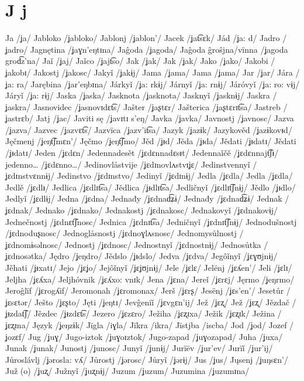 \chapter{J j}
Ja /ʝa/
Jabloko /ʝabloko/
Jablonj /ʝablon’/
Jacek /ʝat͡sɛk/
Jád /ʝa: d/
Jadro /ʝadro/
Jagnętina /ʝaɣn’eŋtɪna/
Jaĝoda /ʝagoda/
Jaĝoda ĝroŝjna/vïnna /ʝagoda grod͡z’na/
Jaǐ /ʝaj/
Jaǐco /ʝajt͡so/
Jak /ʝak/
Jak /ʝak/
Jako /ʝako/
Jakobi /ʝakobɪ/
Jakostj /ʝakosc/
Jakyǐ /ʝakɨj/
Jama /ʝama/
Jama /ʝama/
Jar /ʝar/
Jára /ʝa: ra/
Jarębina /ʝar’eŋbɪna/
Járkyǐ /ʝa: rkɨj/
Járnyǐ /ʝa: rnɨj/
Járóvyǐ /ʝa: ro: vɨj/
Járyǐ /ʝa: rɨj/
Jaska /ʝaska/
Jasknota /ʝasknota/
Jasknyǐ /ʝasknɨj/
Jaskra /ʝaskra/
Jasnovidec /ʝasnovɪdɛt͡s/
Jašter /ʝaʂtɛr/
Jašterica /ʝaʂtɛrɪt͡sa/
Jastreb /ʝastrɛb/
Jatj /ʝac/
Javiti sę /ʝavɪtɪ s’eŋ/
Javka /ʝavka/
Javnostj /ʝavnosc/
Jazva /ʝazva/
Jazvec /ʝazvɛt͡s/
Jazvïca /ʝazv’it͡sa/
Jazyk /ʝazɨk/
Jazykověd /ʝazɨkovᵻd/
Jęčmenj /ʝeŋt͡ʃmɛn’/
Jęčmo /ʝeŋt͡ʃmo/
Jěd /ʝᵻd/
Jěda /ʝᵻda/
Jědati /ʝᵻdatɪ/
Jědati /ʝᵻdatɪ/
Jeden /ʝɛdɛn/
Jedennadesět /ʝɛdɛnnadɛsᵻt/
Jedennaǐčě /ʝɛdɛnnajt͡ʃᵻ/
jedenno… /ʝɛdɛnno…/
Jedinovlåstvije /ʝɛdɪnovlʌstvɪʝɛ/
Jedinstvennyǐ /ʝɛdɪnstvɛnnɨj/
Jedinstvo /ʝɛdɪnstvo/
Jedinyǐ /ʝɛdɪnɨj/
Jedla /ʝɛdla/
Jedla /ʝɛdla/
Jedlě /ʝɛdlᵻ/
Jedlica /ʝɛdlɪt͡sa/
Jědlica /ʝᵻdlɪt͡sa/
Jedličnyǐ /ʝɛdlɪt͡ʃnɨj/
Jědlo /ʝᵻdlo/
Jedlyǐ /ʝɛdlɨj/
Jedna /ʝɛdna/
Jednađy /ʝɛdnad͡ʑɨ/
Jednađy /ʝɛdnad͡ʑɨ/
Jednak /ʝɛdnak/
Jednako /ʝɛdnako/
Jednakostj /ʝɛdnakosc/
Jednakovyǐ /ʝɛdnakovɨj/
Jednečnostj /ʝɛdnɛt͡ʃnosc/
Jednica /ʝɛdnɪt͡sa/
Jedničnyǐ /ʝɛdnɪt͡ʃnɨj/
Jednodušnostj /ʝɛdnoduʂnosc/
Jednoglåsnostj /ʝɛdnoɣlʌsnosc/
Jednomysůlnostj /ʝɛdnomɨsəlnosc/
Jednostj /ʝɛdnosc/
Jednostnyǐ /ʝɛdnostnɨj/
Jednosůtka /ʝɛdnosətka/
Jędro /ʝeŋdro/
Jědslo /ʝᵻdslo/
Jedva /ʝɛdva/
Jegôǐnyǐ /ʝɛɣʊjnɨj/
Jěhati /ʝᵻxatɪ/
Jejo /ʝɛʝo/
Jejôǐnyǐ /ʝɛʝʊjnɨj/
Jele /ʝɛlɛ/
Jelënj /ʝɛʎen’/
Jeli /ʝɛlɪ/
Jeljha /ʝɛʎxa/
Jeljhóvnik /ʝɛʎxo: vnɪk/
Jena /ʝɛna/
Jereǐ /ʝɛrɛj/
Jęrmo /ʝeŋrmo/
Jeroĝlïf /ʝɛrogʎif/
Jeromonah /ʝɛromonax/
Jerš /ʝɛrʂ/
Jesënj /ʝɛs’en’/
Jesetůr /ʝɛsɛtər/
Ješto /ʝɛʂto/
Jęti /ʝeŋtɪ/
Jevĝenïǐ /ʝɛvgɛn’ij/
Jež /ʝɛʐ/
Jež /ʝɛʐ/
Jězdač /ʝᵻzdat͡ʃ/
Jězdec /ʝᵻzdɛt͡s/
Jezero /ʝɛzɛro/
Ježiha /ʝɛʐɪxa/
Ježik /ʝɛʐɪk/
Ježina /ʝɛʐɪna/
Język /ʝeŋzɨk/
Jïgla /iɣla/
Jïkra /ikra/
Jïstjba /iscba/
Jod /ʝod/
Jozef /ʝozɛf/
Jug /ʝuɣ/
Jugo-iztok /ʝuɣoɪztok/
Jugo-zapad /ʝuɣozapad/
Juha /ʝuxa/
Junak /ʝunak/
Junostj /ʝunosc/
Junyǐ /ʝunɨj/
Jurïëv /ʝur’ev/
Jurïǐ /ʝur’ij/
Jůroslávlj /ʝərosla: vʎ/
Jůrostj /ʝərosc/
Jůryǐ /ʝərɨj/
Jus /ʝus/
Jųsenj /ʝuŋsɛn’/
Juž (o) /ʝuʐ/
Južnyǐ /ʝuʐnɨj/
Juzum /ʝuzum/
Juzumina /ʝuzumɪna/